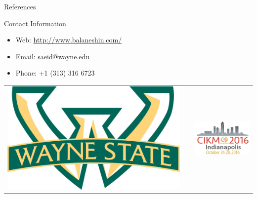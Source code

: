 \documentclass[final]{beamer}
\newlength{\onecolwid}
\begin{document}
\begin{frame}[t]
\begin{columns}[t]
\begin{column}{\onecolwid}
\begin{block}{References}

\nocite{*} %
\small{
\vspace{0.75in}}

\end{block}






\begin{alertblock}{Contact Information}

\begin{itemize}
\item Web: \href{http://www.balaneshin.com/}{http://www.balaneshin.com/}
\item Email: \href{mailto:saeid@wayne.edu}{saeid@wayne.edu}
\item Phone: +1 (313) 316 6723
\end{itemize}

\end{alertblock}

\begin{center}
\begin{tabular}{ccc}
\includegraphics[width=0.3\linewidth]{images/warrior_banded_logo.jpg} & \hfill & \includegraphics[width=0.3\linewidth]{images/cikm16.png}
\end{tabular}
\end{center}


\end{column}
\end{columns}
\end{frame}
\end{document}
